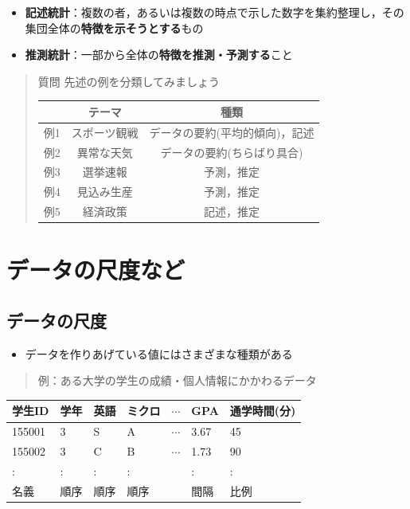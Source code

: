 \documentclass[
]{book}
\providecommand{\tightlist}{%
  \setlength{\itemsep}{0pt}\setlength{\parskip}{0pt}}
\theoremstyle{definition}
\theoremstyle{definition}
\theoremstyle{definition}
\theoremstyle{definition}
\theoremstyle{remark}
\begin{document}
\begin{itemize}
\tightlist
\item
  \textbf{記述統計}：複数の者，あるいは複数の時点で示した数字を集約整理し，その集団全体の\textbf{特徴を示そうとする}もの
\item
  \textbf{推測統計}：一部から全体の\textbf{特徴を推測・予測する}こと
\end{itemize}

\begin{quote}
質問
先述の例を分類してみましょう

\begin{longtable}[]{@{}ccc@{}}
\toprule()
& テーマ & 種類 \\
\midrule()
\endhead
例1 & スポーツ観戦 & データの要約(平均的傾向)，記述 \\
例2 & 異常な天気 & データの要約(ちらばり具合) \\
例3 & 選挙速報 & 予測，推定 \\
例4 & 見込み生産 & 予測，推定 \\
例5 & 経済政策 & 記述，推定 \\
\bottomrule()
\end{longtable}
\end{quote}

\hypertarget{ux30c7ux30fcux30bfux306eux5c3aux5ea6ux306aux3069}{%
\chapter{データの尺度など}\label{ux30c7ux30fcux30bfux306eux5c3aux5ea6ux306aux3069}}

\hypertarget{ux30c7ux30fcux30bfux306eux5c3aux5ea6}{%
\section{データの尺度}\label{ux30c7ux30fcux30bfux306eux5c3aux5ea6}}

\begin{itemize}
\tightlist
\item
  データを作りあげている値にはさまざまな種類がある
\end{itemize}

\begin{quote}
例：ある大学の学生の成績・個人情報にかかわるデータ
\end{quote}

\begin{longtable}[]{@{}lllllll@{}}
\toprule()
学生ID & 学年 & 英語 & ミクロ & \(\cdots\) & GPA & 通学時間(分) \\
\midrule()
\endhead
155001 & 3 & S & A & \(\cdots\) & 3.67 & 45 \\
155002 & 3 & C & B & \(\cdots\) & 1.73 & 90 \\
: & : & : & : & & : & : \\
名義 & 順序 & 順序 & 順序 & & 間隔 & 比例 \\
\bottomrule()
\end{longtable}
\end{document}
